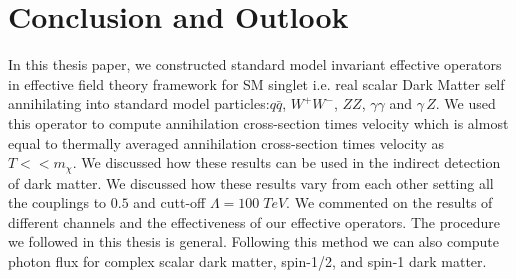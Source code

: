\documentclass[12pt]{report}
\begin{document}
\chapter{Conclusion and Outlook}

In this thesis paper, we constructed standard model invariant effective operators in effective field theory framework for SM singlet i.e. real scalar Dark Matter self annihilating into standard model particles:$q\bar{q}$, $W^+ W^-$, $ZZ$, $\gamma\gamma$ and $\gamma\, Z$. We used this operator to compute annihilation cross-section times velocity which is almost equal to thermally averaged annihilation cross-section times velocity as $T<< m_\chi$. We discussed how these results can be used in the indirect detection of dark matter. We discussed how these results vary from each other setting all the couplings to $0.5$ and cutt-off $\Lambda=100 \; TeV$. We commented on the results of different channels and the effectiveness of our effective operators. The procedure we followed in this thesis is general. Following this method we can also compute photon flux for complex scalar dark matter, spin-1/2, and spin-1 dark matter. 
\end{document}
